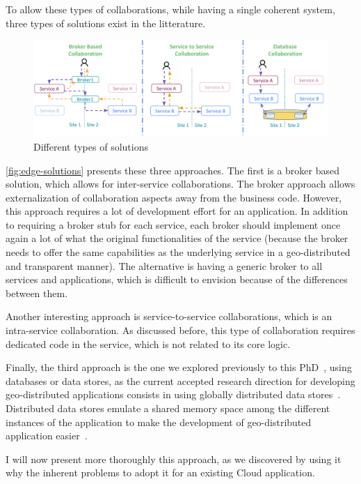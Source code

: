 To allow these types of collaborations, while having a single coherent
system, three types of solutions exist in the litterature.


\begin{figure}[htbp]
  \centering
  \includegraphics[width=1\textwidth]{figs/pdf/solutions}
  \caption{Different types of solutions}
  \label{fig:edge-solutions}
\end{figure}

\autoref{fig:edge-solutions} presents these three approaches.
%
The first is a broker based solution, which allows for inter-service
collaborations.
%
The broker approach allows externalization of collaboration aspects
away from the business code.
%
However, this approach requires a lot of development effort for an
application.
%
In addition to requiring a broker stub for each service, each broker
should implement once again a lot of what the original functionalities
of the service (because the broker needs to offer the same
capabilities as the underlying service in a geo-distributed and
transparent manner).
%
The alternative is having a generic broker to all services and
applications, which is difficult to envision because of the
differences between them.

Another interesting approach is service-to-service collaborations,
which is an intra-service collaboration.
%
As discussed before, this type of collaboration requires dedicated
code in the service, which is not related to its core logic.

Finally, the third approach is the one we explored previously to this
PhD~\cite{LPSD17, Che17, DCL18}, using databases or data stores, as
the current accepted research direction for developing geo-distributed
applications consists in using globally distributed data
stores~\cite{Aba12}.
%
Distributed data stores emulate a shared memory space among the
different instances of the application to make the development of
geo-distributed application easier~\cite{SBPB+18}.

%
I will now present more thoroughly this approach, as we discovered by
using it why the inherent problems to adopt it for an existing Cloud
application.

